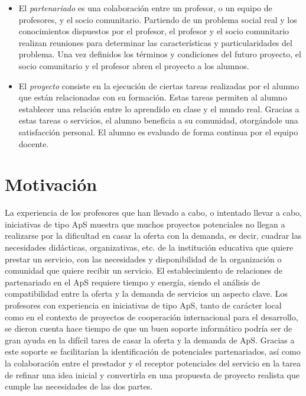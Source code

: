 \documentclass[11pt]{book}
\begin{document}
\begin{itemize}
	\item El \emph{partenariado} es una colaboración entre un profesor, o un equipo de profesores, y el socio comunitario. Partiendo de un problema social real y los conocimientos dispuestos por el profesor, el profesor y el socio comunitario realizan reuniones para determinar las características y particularidades del problema. Una vez definidos los términos y condiciones del futuro proyecto, el socio comunitario y el profesor abren el proyecto a los alumnos.
	\item El \emph{proyecto} consiste en la ejecución de ciertas tareas realizadas por el alumno que están relacionadas con su formación. Estas tareas permiten al alumno establecer una relación entre lo aprendido en clase y el mundo real. Gracias a estas tareas o servicios, el alumno beneficia a su comunidad, otorgándole una satisfacción personal. El alumno es evaluado de forma continua por el equipo docente.
\end{itemize}
\section{Motivación}\label{cap:cont-motidvacion}
La experiencia de los profesores que han llevado a cabo, o intentado
llevar a cabo, iniciativas de tipo ApS muestra
que muchos proyectos potenciales no llegan a realizarse por la
dificultad en casar la oferta con la demanda, es decir, cuadrar las
necesidades didácticas, organizativas, etc. de la institución educativa
que quiere prestar un servicio, con las necesidades y disponibilidad de
la organización o comunidad que quiere recibir un servicio. El
establecimiento de relaciones de partenariado en el ApS requiere tiempo
y energía, siendo el análisis de compatibilidad entre la oferta y la
demanda de servicios un aspecto clave. Los profesores con experiencia en
iniciativas de tipo ApS, tanto de carácter local como en el contexto de
proyectos de cooperación internacional para el desarrollo, se dieron
cuenta hace tiempo de que un buen soporte informático podría ser de gran
ayuda en la difícil tarea de casar la oferta y la demanda de ApS.
Gracias a este soporte se facilitarían la identificación de potenciales
partenariados, así como la colaboración entre el prestador y el receptor
potenciales del servicio en la tarea de refinar una idea inicial y
convertirla en una propuesta de proyecto realista que cumple las
necesidades de las dos partes.\\\\
\end{document}
